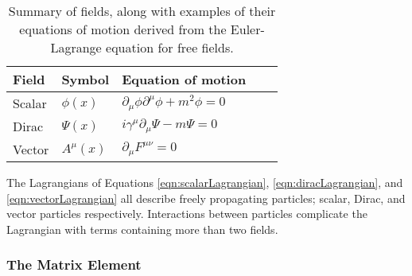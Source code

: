 \begin{table}[htp]
\begin{center}
{\footnotesize
\begin{tabular}{l l l l l}
\toprule
Field & Symbol & Equation of motion  \\
\midrule
Scalar & $\phi(x)$    & $\partial_\mu\phi\partial^\mu\phi+m^2\phi=0$  \\
Dirac  & $\Psi(x)$    & $i\gamma^\mu\partial_\mu\Psi-m\Psi=0$  \\
Vector & $A^\mu(x)$   & $\partial_\mu F^{\mu\nu}=0$  \\
\bottomrule
\end{tabular}
}
\caption{Summary of fields, along with examples of their equations of motion derived from the Euler-Lagrange equation for free fields.}
\label{tab:fields}
\end{center}
\end{table}

The Lagrangians of Equations \ref{eqn:scalarLagrangian}, \ref{eqn:diracLagrangian}, and \ref{eqn:vectorLagrangian} all describe freely propagating particles; scalar, Dirac, and vector particles respectively.
Interactions between particles complicate the Lagrangian with terms containing more than two fields.

\subsubsection{The Matrix Element}\label{sec:me}

